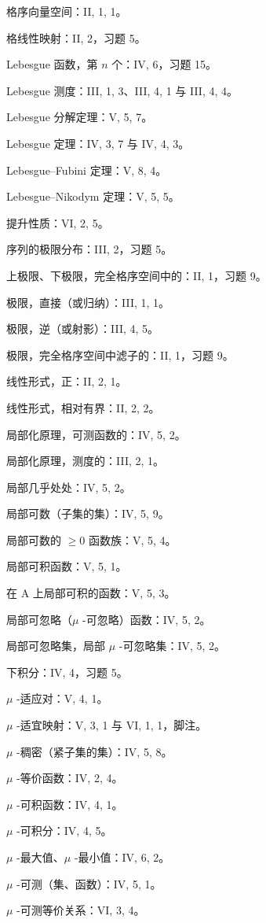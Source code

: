 格序向量空间：II, 1, 1。

格线性映射：II, 2，习题 5。

Lebesgue 函数，第 \(n\) 个：IV, 6，习题 15。

Lebesgue 测度：III, 1, 3、III, 4, 1 与 III, 4, 4。

Lebesgue 分解定理：V, 5, 7。

Lebesgue 定理：IV, 3, 7 与 IV, 4, 3。

Lebesgue--Fubini 定理：V, 8, 4。

Lebesgue--Nikodym 定理：V, 5, 5。

提升性质：VI, 2, 5。

序列的极限分布：III, 2，习题 5。

上极限、下极限，完全格序空间中的：II, 1，习题 9。

极限，直接（或归纳）：III, 1, 1。

极限，逆（或射影）：III, 4, 5。

极限，完全格序空间中滤子的：II, 1，习题 9。

线性形式，正：II, 2, 1。

线性形式，相对有界：II, 2, 2。

局部化原理，可测函数的：IV, 5, 2。

局部化原理，测度的：III, 2, 1。

局部几乎处处：IV, 5, 2。

局部可数（子集的集）：IV, 5, 9。

局部可数的 \(\geqslant 0\) 函数族：V, 5, 4。

局部可积函数：V, 5, 1。

在 A 上局部可积的函数：V, 5, 3。

局部可忽略（\(\mu\) -可忽略）函数：IV, 5, 2。

局部可忽略集，局部 \(\mu\) -可忽略集：IV, 5, 2。

下积分：IV, 4，习题 5。

\(\mu\) -适应对：V, 4, 1。

\(\mu\) -适宜映射：V, 3, 1 与 VI, 1, 1，脚注。

\(\mu\) -稠密（紧子集的集）：IV, 5, 8。

\(\mu\) -等价函数：IV, 2, 4。

\(\mu\) -可积函数：IV, 4, 1。

\(\mu\) -可积分：IV, 4, 5。

\(\mu\) -最大值、\(\mu\) -最小值：IV, 6, 2。

\(\mu\) -可测（集、函数）：IV, 5, 1。

\(\mu\) -可测等价关系：VI, 3, 4。

